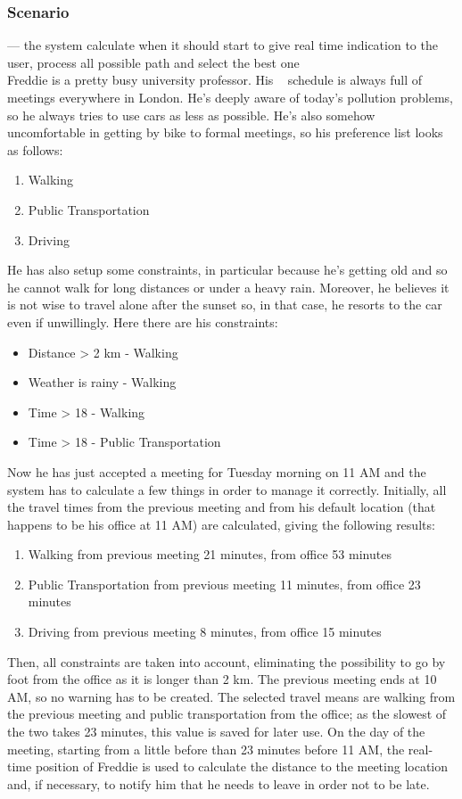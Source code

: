 \subsubsection{Scenario \thecountScenarios }
--- the system calculate when it should start to give real time indication to the user, process all possible path and select the best one\\

Freddie is a pretty busy university professor. His \projectname~ schedule is always full of meetings everywhere in London. He's deeply aware of today's pollution problems, so he always tries to use cars as less as possible. He's also somehow uncomfortable in getting by bike to formal meetings, so his preference list looks as follows:
\begin{enumerate}
\item Walking
\item Public Transportation
\item Driving
\end{enumerate}
He has also setup some constraints, in particular because he's getting old and so he cannot walk for long distances or under a heavy rain. Moreover, he believes it is not wise to travel alone after the sunset so, in that case, he resorts to the car even if unwillingly. Here there are his constraints:
\begin{itemize}
\item Distance > 2 km - Walking
\item Weather is rainy - Walking
\item Time > 18 - Walking
\item Time > 18 - Public Transportation
\end{itemize}
Now he has just accepted a meeting for Tuesday morning on 11 AM and the system has to calculate a few things in order to manage it correctly. Initially, all the travel times from the previous meeting and from his default location (that happens to be his office at 11 AM) are calculated, giving the following results:
\begin{enumerate}
\item Walking		from previous meeting 21 minutes, from office 53 minutes 
\item Public Transportation		from previous meeting 11 minutes, from office 23 minutes
\item Driving		from previous meeting 8 minutes, from office 15 minutes
\end{enumerate}
Then, all constraints are taken into account, eliminating the possibility to go by foot from the office as it is longer than 2 km. The previous meeting ends at 10 AM, so no warning has to be created. The selected travel means are walking from the previous meeting and public transportation from the office; as the slowest of the two takes 23 minutes, this value is saved for later use. On the day of the meeting, starting from a little before than 23 minutes before 11 AM, the real-time position of Freddie is used to calculate the distance to the meeting location and, if necessary, to notify him that he needs to leave in order not to be late.


